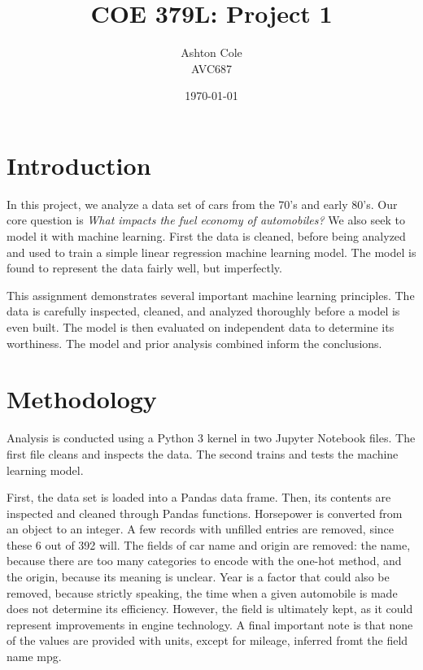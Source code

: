 \documentclass{article}
\title{COE 379L: Project 1}
\author{Ashton Cole\\AVC687}
\date{\today}
\begin{document}
\maketitle

\section{Introduction}

In this project, we analyze a data set of cars from the 70's and early 80's. Our core question is \emph{What impacts the fuel economy of automobiles?} We also seek to model it with machine learning. First the data is cleaned, before being analyzed and used to train a simple linear regression machine learning model. The model is found to represent the data fairly well, but imperfectly.

This assignment demonstrates several important machine learning principles. The data is carefully inspected, cleaned, and analyzed thoroughly before a model is even built. The model is then evaluated on independent data to determine its worthiness. The model and prior analysis combined inform the conclusions.

\section{Methodology}

Analysis is conducted using a Python 3 kernel in two Jupyter Notebook files. The first file cleans and inspects the data. The second trains and tests the machine learning model.

First, the data set is loaded into a Pandas data frame. Then, its contents are inspected and cleaned through Pandas functions. Horsepower is converted from an object to an integer. A few records with unfilled entries are removed, since these 6 out of 392 will. The fields of car name and origin are removed: the name, because there are too many categories to encode with the one-hot method, and the origin, because its meaning is unclear. Year is a factor that could also be removed, because strictly speaking, the time when a given automobile is made does not determine its efficiency. However, the field is ultimately kept, as it could represent improvements in engine technology. A final important note is that none of the values are provided with units, except for mileage, inferred fromt the field name mpg.
\end{document}
